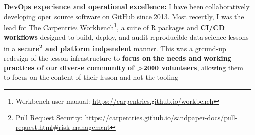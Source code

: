 
\vspace{2ex}

\textbf{DevOps experience and operational excellence:}
I have been collaboratively developing open source software on GitHub since 2013.
Most recently, I was the lead for The Carpentries Workbench\footnote{Workbench user manual: \url{https://carpentries.github.io/workbench}}, 
a suite of R packages and \textbf{CI/CD workflows} designed to build, deploy, and audit reproducible data science lessons in a \textbf{secure\footnote{Pull Request Security: \url{https://carpentries.github.io/sandpaper-docs/pull-request.html\#risk-management}} and platform indpendent} manner.
This was a ground-up redesign of the lesson infrastructure to \textbf{focus on
the needs and working practices of our diverse community of \textgreater2000 volunteers},
allowing them to focus on the content of their lesson and not the tooling.

\vspace{2ex}

